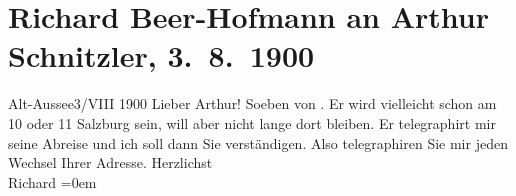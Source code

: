 

         
         \renewcommand{\erwaehntePersonen}{Personen: Paul Goldmann}
         \renewcommand{\erwaehnteOrte}{Orte: Altaussee, Bad Ischl, Salzburg}
         \renewcommand{\erwaehnteWerke}{}
               \section[Richard Beer-Hofmann an Arthur Schnitzler, 3. 8. 1900]{ Richard Beer-Hofmann an Arthur Schnitzler, 3. 8. 1900}\nopagebreak{}\rehead{ }\begin{ledgroupsized}[t]{13cm}\normalsize\beginnumbering \toendnotes[C]{\smallbreak\pagebreak[2]} 
\toendnotes[C]{\smallbreak}\pstart
           \raggedleft{}{\pb}Alt-Aussee3/VIII 1900\pend
           \pstart
           Lieber Arthur! Soeben von \label{K_L01064-22v}\label{K_L01064-22h}. Er wird vielleicht
               schon am 10 oder 11{ }Salzburg sein, will aber nicht lange dort bleiben.
                  Er telegraphirt mir seine Abreise und ich
               soll dann Sie verständigen. Also telegraphiren Sie mir jeden Wechsel Ihrer
               Adresse.\pend
           \pstart
           Herzlichst{\\[\baselineskip]}\spacefill\mbox{Richard}\pend
           \leftskip=0em{}
         
         \endnumbering{}\end{ledgroupsized}  \newcommand{\dateiname}{L01064}\newcommand{\titel}{Richard Beer-Hofmann an Arthur Schnitzler, 3. 8. 1900}\newcommand{\editorInnen}{Martin Anton Müller und Gerd-Hermann Susen}
      